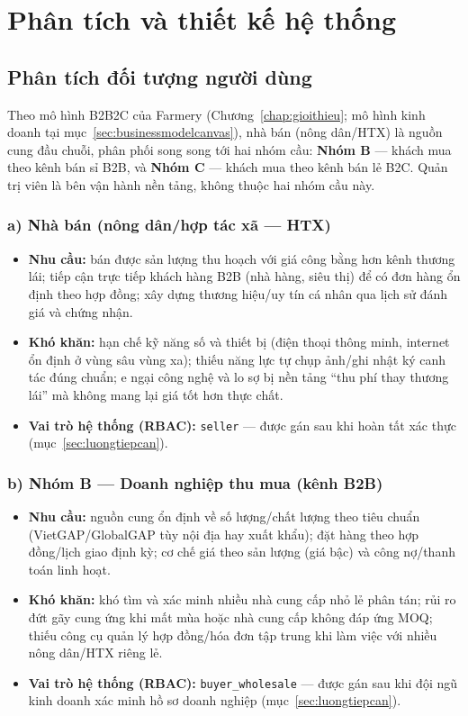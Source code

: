 \chapter{Phân tích và thiết kế hệ thống}
\label{chap:phantich}

\section{Phân tích đối tượng người dùng}
\label{sec:doituongnguoidung}

Theo mô hình B2B2C của Farmery (Chương~\ref{chap:gioithieu}; mô hình kinh doanh tại mục~\ref{sec:businessmodelcanvas}), nhà bán (nông dân/HTX) là nguồn cung đầu chuỗi, phân phối song song tới hai nhóm cầu: \textbf{Nhóm B} --- khách mua theo kênh bán sỉ B2B, và \textbf{Nhóm C} --- khách mua theo kênh bán lẻ B2C. Quản trị viên là bên vận hành nền tảng, không thuộc hai nhóm cầu này.

\subsection*{a) Nhà bán (nông dân/hợp tác xã --- HTX)}
\begin{itemize}
    \item \textbf{Nhu cầu:} bán được sản lượng thu hoạch với giá công bằng hơn kênh thương lái; tiếp cận trực tiếp khách hàng B2B (nhà hàng, siêu thị) để có đơn hàng ổn định theo hợp đồng; xây dựng thương hiệu/uy tín cá nhân qua lịch sử đánh giá và chứng nhận.
    \item \textbf{Khó khăn:} hạn chế kỹ năng số và thiết bị (điện thoại thông minh, internet ổn định ở vùng sâu vùng xa); thiếu năng lực tự chụp ảnh/ghi nhật ký canh tác đúng chuẩn; e ngại công nghệ và lo sợ bị nền tảng ``thu phí thay thương lái'' mà không mang lại giá tốt hơn thực chất.
    \item \textbf{Vai trò hệ thống (RBAC):} \texttt{seller} --- được gán sau khi hoàn tất xác thực (mục~\ref{sec:luongtiepcan}).
\end{itemize}

\subsection*{b) Nhóm B --- Doanh nghiệp thu mua (kênh B2B)}
\begin{itemize}
    \item \textbf{Nhu cầu:} nguồn cung ổn định về số lượng/chất lượng theo tiêu chuẩn (VietGAP/GlobalGAP tùy nội địa hay xuất khẩu); đặt hàng theo hợp đồng/lịch giao định kỳ; cơ chế giá theo sản lượng (giá bậc) và công nợ/thanh toán linh hoạt.
    \item \textbf{Khó khăn:} khó tìm và xác minh nhiều nhà cung cấp nhỏ lẻ phân tán; rủi ro đứt gãy cung ứng khi mất mùa hoặc nhà cung cấp không đáp ứng MOQ; thiếu công cụ quản lý hợp đồng/hóa đơn tập trung khi làm việc với nhiều nông dân/HTX riêng lẻ.
    \item \textbf{Vai trò hệ thống (RBAC):} \texttt{buyer\_wholesale} --- được gán sau khi đội ngũ kinh doanh xác minh hồ sơ doanh nghiệp (mục~\ref{sec:luongtiepcan}).
\end{itemize}

